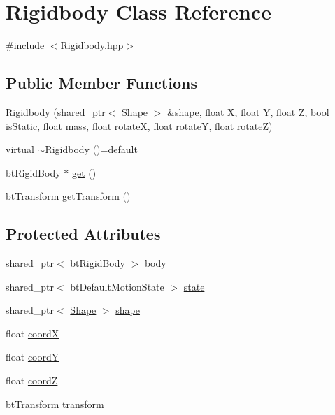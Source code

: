 \hypertarget{class_rigidbody}{}\section{Rigidbody Class Reference}
\label{class_rigidbody}


{\ttfamily \#include $<$Rigidbody.\+hpp$>$}

\subsection*{Public Member Functions}
\begin{DoxyCompactItemize}
\item 
\mbox{\hyperlink{class_rigidbody_a583313febf979a0e72cbc59a5fcc2ab4}{Rigidbody}} (shared\+\_\+ptr$<$ \mbox{\hyperlink{class_shape}{Shape}} $>$ \&\mbox{\hyperlink{class_rigidbody_a817fb8d0991858bd31bdaf8f60df1346}{shape}}, float X, float Y, float Z, bool is\+Static, float mass, float rotateX, float rotateY, float rotateZ)
\item 
virtual \mbox{\hyperlink{class_rigidbody_aeacb70ba57d80c85cfb6f5f50ebecf96}{$\sim$\+Rigidbody}} ()=default
\item 
bt\+Rigid\+Body $\ast$ \mbox{\hyperlink{class_rigidbody_a189022541bfdf0717639e681934f996d}{get}} ()
\item 
bt\+Transform \mbox{\hyperlink{class_rigidbody_a4e63ac1ae27de4b0c84e6a3956fc0edd}{get\+Transform}} ()
\end{DoxyCompactItemize}
\subsection*{Protected Attributes}
\begin{DoxyCompactItemize}
\item 
shared\+\_\+ptr$<$ bt\+Rigid\+Body $>$ \mbox{\hyperlink{class_rigidbody_adc3e81959384b3b97c786805592a36c3}{body}}
\item 
shared\+\_\+ptr$<$ bt\+Default\+Motion\+State $>$ \mbox{\hyperlink{class_rigidbody_a532632942cea50d9f5eb89da3f017777}{state}}
\item 
shared\+\_\+ptr$<$ \mbox{\hyperlink{class_shape}{Shape}} $>$ \mbox{\hyperlink{class_rigidbody_a817fb8d0991858bd31bdaf8f60df1346}{shape}}
\item 
float \mbox{\hyperlink{class_rigidbody_abe7f1cec1c81ff1c0544cdb49ca8cded}{coordX}}
\item 
float \mbox{\hyperlink{class_rigidbody_a6bb882de91a461cc33c7212f53ec0289}{coordY}}
\item 
float \mbox{\hyperlink{class_rigidbody_a7bac1a0470551f7fec7884b68742a8f3}{coordZ}}
\item 
bt\+Transform \mbox{\hyperlink{class_rigidbody_acb3059a56e65ec7e6a8e59462c6023e4}{transform}}
\end{DoxyCompactItemize}


